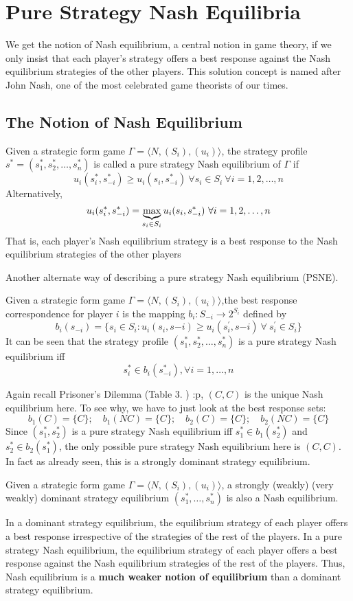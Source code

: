 \section{Pure Strategy Nash Equilibria}
We get the notion of Nash equilibrium, a central notion in game theory, if we only insist that each player’s strategy offers a best response against the Nash equilibrium strategies of the other players.
This solution concept is named after John Nash, one of the most celebrated game theorists of our times.
\subsection{The Notion of Nash Equilibrium}
\begin{defn}
	Given a strategic form game $\Gamma = \langle N,(S_i),(u_i)\rangle$, the strategy profile $s^*=(s_1^*,s_2^*,\ldots,s_n^*)$ is called a pure strategy Nash equilibrium of $\Gamma$ if
	\[u_i(s^*_i,s^*_{-i})\geq u_i(s_i,s^*_{-i})\ \forall s_{i} \in S_{i}\ \forall i=1,2,\ldots,n\]
	Alternatively,
	\[u_i(s^*_i,s^*_{-i})= \underbrace{\operatorname{max}}_{s_{i} \in S_{i}} u_i(s_i,s^*_{-i})\ \forall i=1,2,\ldots,n\]
	That is, each player’s Nash equilibrium strategy is a best response to the Nash equilibrium strategies of the other players
\end{defn}
Another alternate way of describing a pure strategy Nash equilibrium (PSNE).
\begin{defn}{\label{def:brc}}
	Given a strategic form game $\Gamma = \langle N,(S_i),(u_i)\rangle$,the best response correspondence for player $i$ is the mapping $b_i : S_{-i} \rightarrow 2^{S_i}$ defined by
	\[b_i(s_{-i}) = \{s_i \in S_i : u_i(s_i, s{-i}) \geq u_i(s^\prime_i, s{-i}) \ \forall\  s^\prime_i \in S_i\}\]
	It can be seen that the strategy profile $(s_1^*,s_2^*,\ldots,s_n^*)$ is a pure strategy Nash equilibrium iff
	\[s^*_i \in b_i(s^*_{-i}), \forall i = 1,\ldots, n\]
\end{defn}
Again recall Prisoner's Dilemma (Table 3.
) :p, $(C, C)$ is the unique Nash equilibrium here.
To see why, we have to just look at the best response sets:
\[b_1(C) = \{C\};\quad b_1(NC) = \{C\};\quad b_2(C) = \{C\};\quad b_2(NC) = \{C\}\]
Since $(s^*_1, s^*_2)$ is a pure strategy Nash equilibrium iff $s^*_1 \in b_1(s^*_2)$ and $s^*_2 \in b_2(s^*_1)$, the only
possible pure strategy Nash equilibrium here is $(C, C)$.
In fact as already seen, this is a strongly dominant strategy equilibrium.
\begin{rem}
	Given a strategic form game $\Gamma = \langle N,(S_i),(u_i)\rangle$, a strongly (weakly) (very weakly) dominant strategy equilibrium $(s_1^*,\ldots,s_n^*)$ is also a Nash equilibrium.

	In a dominant strategy equilibrium, the equilibrium strategy of each player offers a best response irrespective of the strategies of the rest of the players.
	In a pure strategy Nash equilibrium, the equilibrium strategy of each player offers a best response against the Nash equilibrium strategies of the rest of the players.
	Thus, Nash equilibrium is a \textbf{much weaker notion of equilibrium} than a dominant strategy equilibrium.
\end{rem}

